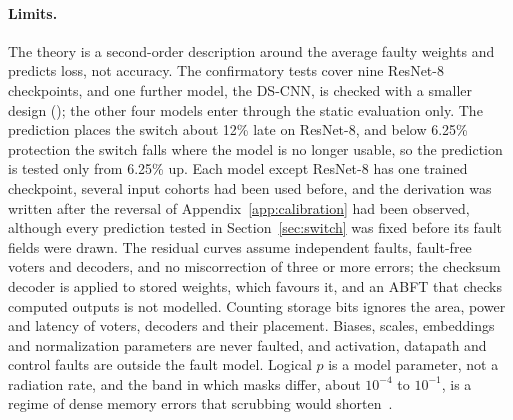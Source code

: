 \paragraph{Limits.} The theory is a second-order description around the average faulty weights and predicts loss, not accuracy. The confirmatory tests cover nine ResNet-8 checkpoints, and one further model, the DS-CNN, is checked with a smaller design (); the other four models enter through the static evaluation only. The prediction places the switch about 12\% late on ResNet-8, and below 6.25\% protection the switch falls where the model is no longer usable, so the prediction is tested only from 6.25\% up. Each model except ResNet-8 has one trained checkpoint, several input cohorts had been used before, and the derivation was written after the reversal of Appendix~\ref{app:calibration} had been observed, although every prediction tested in Section~\ref{sec:switch} was fixed before its fault fields were drawn. The residual curves assume independent faults, fault-free voters and decoders, and no miscorrection of three or more errors; the checksum decoder is applied to stored weights, which favours it, and an ABFT that checks computed outputs is not modelled. Counting storage bits ignores the area, power and latency of voters, decoders and their placement. Biases, scales, embeddings and normalization parameters are never faulted, and activation, datapath and control faults are outside the fault model. Logical $p$ is a model parameter, not a radiation rate, and the band in which masks differ, about $10^{-4}$ to $10^{-1}$, is a regime of dense memory errors that scrubbing would shorten~\cite{biswas2005avf}.
